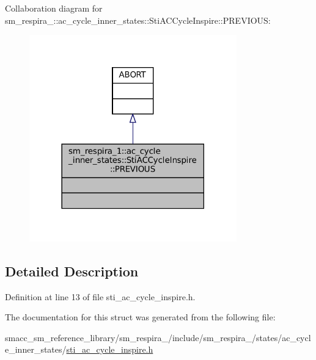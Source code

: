 Collaboration diagram for sm\+\_\+respira\+\_\+:\+:ac\+\_\+cycle\+\_\+inner\+\_\+states\+:\+:Sti\+A\+C\+Cycle\+Inspire\+:\+:P\+R\+E\+V\+I\+O\+US\+:
\nopagebreak
\begin{figure}[H]
\begin{center}
\leavevmode
\includegraphics[width=254pt]{structsm__respira__1_1_1ac__cycle__inner__states_1_1StiACCycleInspire_1_1PREVIOUS__coll__graph}
\end{center}
\end{figure}


\subsection{Detailed Description}


Definition at line 13 of file sti\+\_\+ac\+\_\+cycle\+\_\+inspire.\+h.



The documentation for this struct was generated from the following file\+:\begin{DoxyCompactItemize}
\item 
smacc\+\_\+sm\+\_\+reference\+\_\+library/sm\+\_\+respira\+\_/include/sm\+\_\+respira\+\_/states/ac\+\_\+cycle\+\_\+inner\+\_\+states/\hyperlink{sti__ac__cycle__inspire_8h}{sti\+\_\+ac\+\_\+cycle\+\_\+inspire.\+h}\end{DoxyCompactItemize}
